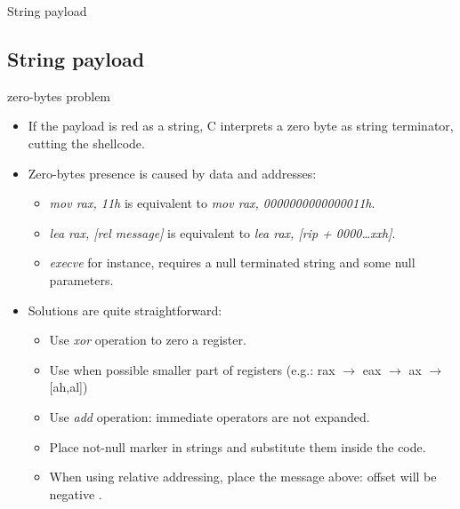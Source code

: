 \begin{frame}[shrink]{String payload}
	\subsection{String payload}
	\begin{block}{zero-bytes problem}
		\begin{itemize}
			\item If the payload is red as a string, C interprets a zero byte as
				string terminator, cutting the shellcode.
			\item Zero-bytes presence is caused by data and addresses:
				\begin{itemize}
					\item \emph{mov rax, 11h} is equivalent to \emph{mov rax, 0000000000000011h}.
					\item \emph{lea rax, [rel message]} is equivalent to \emph{lea rax, [rip + 0000\ldots{}xxh]}.
						\item \emph{execve} for instance, requires a null terminated string and some null parameters.
				\end{itemize}
			\item Solutions are quite straightforward:
				\begin{itemize}
					\item Use \emph{xor} operation to zero a register.
					\item Use when possible smaller part of registers (e.g.: rax $\rightarrow$ eax $\rightarrow$ ax $\rightarrow$ [ah,al])
					\item Use \emph{add} operation: immediate operators are not expanded.
					\item Place not-null marker in strings and substitute them inside the code.
					\item When using relative addressing, place the message above: offset will be negative \cite{mark}.
				\end{itemize}
		\end{itemize}
	\end{block}
\end{frame}

